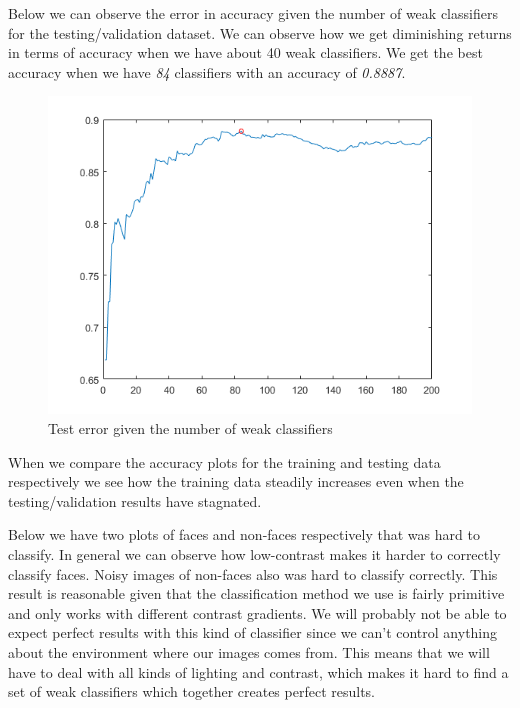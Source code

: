 \documentclass[a4paper,12pt]{article}
\begin{document}
Below we can observe the error in accuracy given the number of weak classifiers for the testing/validation dataset. We can observe how we get diminishing returns in terms of accuracy when we have about 40 weak classifiers. We get the best accuracy when we have \textit{84} classifiers with an accuracy of \textit{0.8887}.

\begin{figure}[H]
\centering
\caption{Test error given the number of weak classifiers}\label{fig:test_error}
  \begin{minipage}[]{0.80\textwidth}
  \includegraphics[width=\textwidth]{figures/test_error.png}
  \end{minipage}
\end{figure}

When we compare the accuracy plots for the training and testing data respectively we see how the training data steadily increases even when the testing/validation results have stagnated. 

Below we have two plots of faces and non-faces respectively that was hard to classify. In general we can observe how low-contrast makes it harder to correctly classify faces. Noisy images of non-faces also was hard to classify correctly. This result is reasonable given that the classification method we use is fairly primitive and only works with different contrast gradients. We will probably not be able to expect perfect results with this kind of classifier since we can't control anything about the environment where our images comes from. This means that we will have to deal with all kinds of lighting and contrast, which makes it hard to find a set of weak classifiers which together creates perfect results.
\end{document}
